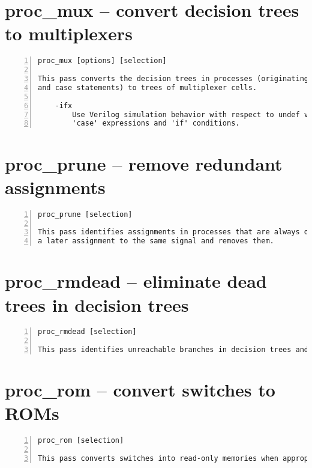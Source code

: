 \section{proc\_mux -- convert decision trees to multiplexers}
\label{cmd:proc_mux}
\begin{lstlisting}[numbers=left,frame=single]
    proc_mux [options] [selection]

This pass converts the decision trees in processes (originating from if-else
and case statements) to trees of multiplexer cells.

    -ifx
        Use Verilog simulation behavior with respect to undef values in
        'case' expressions and 'if' conditions.
\end{lstlisting}

\section{proc\_prune -- remove redundant assignments}
\label{cmd:proc_prune}
\begin{lstlisting}[numbers=left,frame=single]
    proc_prune [selection]

This pass identifies assignments in processes that are always overwritten by
a later assignment to the same signal and removes them.
\end{lstlisting}

\section{proc\_rmdead -- eliminate dead trees in decision trees}
\label{cmd:proc_rmdead}
\begin{lstlisting}[numbers=left,frame=single]
    proc_rmdead [selection]

This pass identifies unreachable branches in decision trees and removes them.
\end{lstlisting}

\section{proc\_rom -- convert switches to ROMs}
\label{cmd:proc_rom}
\begin{lstlisting}[numbers=left,frame=single]
    proc_rom [selection]

This pass converts switches into read-only memories when appropriate.
\end{lstlisting}

